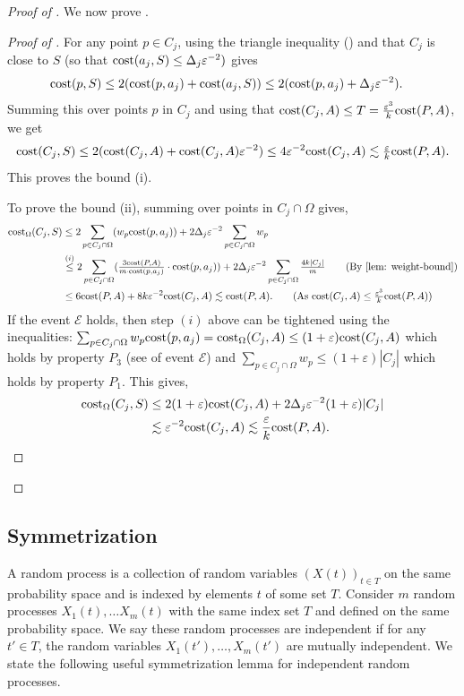 \documentclass[11pt]{article}
\theoremstyle{restate}
\theoremstyle{definition}
\newcommand{\eps}{\ensuremath{\varepsilon}}
\newcommand{\cost}{\textnormal{cost}}
\newcommand{\costom}{\cost_\Omega} %
\begin{document}
\begin{proof}[Proof of ]
We now prove .
\begin{proof}[Proof of ]
For any point $p \in C_j$, using the triangle inequality () and that $C_j$ is close to $S$ (so that $\cost(a_j,S)\leq \Delta_j \eps^{-2})$ gives 
\begin{align}\label{eq: tiny3}
\cost(p,S) &\leq 2(\cost(p,a_j) + \cost(a_j,S))
\leq 2(\cost(p,a_j) + \Delta_j \eps^{-2}).
\end{align}
Summing this over points $p$ in $C_j$ and using that $\cost(C_j, A) \leq T = \tfrac{\eps^3}{k} \cost(P,A)$, we get
\begin{align*}\label{eq: tiny4}
    \cost(C_j,S) \leq 2 (\cost(C_j,A) + \cost(C_j,A) \eps^{-2}) \leq 4 \eps^{-2}\cost(C_j,A) \lesssim \tfrac{\eps}{k} \cost(P,A). 
\end{align*}
This proves the bound (i). 

To prove the bound (ii), summing  over points in $C_j \cap \Omega$ gives,
\begin{align*}
    \costom(C_j, S) &\leq 2 \sum_{p \in C_j \cap \Omega} (w_p \cost(p,a_j)) + 2\Delta_j \eps^{-2} \sum_{p \in C_j \cap \Omega} w_p\\
    &\overset{(i)}{\leq} 2 \sum_{p \in C_j \cap \Omega} (\tfrac{3\cost(P,A)}{m\cdot \cost(p,a_j)} \cdot \cost(p,a_j)) + 2\Delta_j \eps^{-2} \sum_{p \in C_j \cap \Omega} \tfrac{4k|C_j|}{m} \tag{By \Cref{lem: weight-bound}}\\
    &\leq 6 \cost(P,A) + 8k\eps^{-2} \cost(C_j,A) \lesssim \cost(P,A). \tag{As $\cost(C_j, A) \leq \tfrac{\eps^3}{k} \cost(P,A)$}
\end{align*}
\allowdisplaybreaks
If the event $\mathcal{E}$ holds, then step $(i)$ above can be tightened using the inequalities: $\sum_{p \in C_j \cap \Omega} w_p \cost(p,a_j) = \costom(C_j, A) \leq (1+\eps) \cost(C_j, A)$ which holds by property $P_3$ (see  of event $\mathcal{E}$) and $\sum_{p \in C_j \cap \Omega} w_p \leq (1+\eps) |C_j|$ which holds by property $P_1$. 
This gives, 
\begin{align*}
    \costom(C_j, S) &\leq 2(1+\eps) \cost(C_j,A) + 2\Delta_j \eps^{-2} (1+\eps) |C_j|\\
    & \lesssim \eps^{-2} \cost(C_j,A) 
    \lesssim \frac{\eps}{k} \cost(P,A).\qedhere
\end{align*}
\end{proof}
\end{proof}
\subsection{Symmetrization}
A random process is a collection of random variables $(X(t))_{t \in T}$ on the same probability space and is indexed by elements $t$ of some set $T$. Consider $m$ random processes $X_1(t), \ldots X_m(t)$ with the same index set $T$ and defined on the same probability space. We say these random processes are independent if for any $t' \in T$, the random variables $X_1(t'), \ldots, X_m(t')$ are mutually independent. We state the following useful symmetrization lemma for independent random processes.
\end{document}
